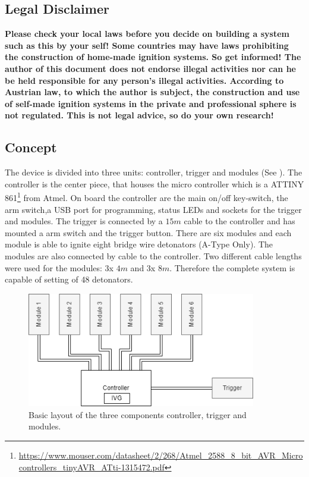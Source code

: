 \subsection{Legal Disclaimer}
\textbf{Please check your local laws before you decide on building a system such as this by your self! Some countries may have laws prohibiting the construction of home-made ignition systems. So get informed! The author of this document does not endorse illegal activities nor can he be held responsible for any person's illegal activities. According to Austrian law, to which the author is subject, the construction and use of self-made ignition systems in the private and professional sphere is not regulated. This is not legal advice, so do your own research!}\\

\pagebreak
\subsection{Concept}
\label{Concept}
The device is divided into three units: controller, trigger and modules (See ). The controller is the center piece, that houses the micro controller which is a ATTINY 861\footnote{\url{https://www.mouser.com/datasheet/2/268/Atmel_2588_8_bit_AVR_Microcontrollers_tinyAVR_ATti-1315472.pdf}} from Atmel. On board the controller are the main on/off key-switch, the arm switch,a USB port for programming, status LEDs and sockets for the trigger and modules. The trigger is connected by a $15m$ cable to the controller and has mounted a arm switch and the trigger button. There are six modules and each module is able to ignite eight bridge wire detonators (A-Type Only). The modules are also connected by cable to the controller. Two different cable lengths were used for the modules: 3x $4m$ and 3x $8m$. Therefore the complete system is capable of setting of 48 detonators.

\begin{figure}[!ht]
    \centering
    \includegraphics[width=10cm]{./Figures/concept_all.png}
    \caption{Basic layout of the three components controller, trigger and modules.}
    \label{fig:concept}     
\end{figure}

